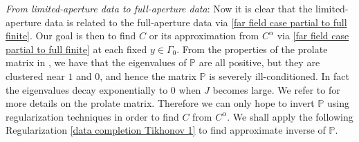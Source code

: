 \documentclass[final]{siamltex}
\begin{document}
\vspace{1\baselineskip}

\noindent\textit{From limited-aperture data to full-aperture data}:
Now it is clear that the limited-aperture data is related to the full-aperture data via  \eqref{far field case partial to full finite}. Our goal is then to find $C$ or its approximation from $C^\alpha $ via \eqref{far field case partial to full finite} at each fixed $y \in \Gamma_0$. From the properties of the prolate matrix in \cite[Lemma 3.2]{DLMZ2021}, we have that the eigenvalues of $\mathbb{P}$ are all positive, but they are clustered near $1$ and $0$, and hence the matrix $\mathbb{P}$  is severely ill-conditioned. In fact the eigenvalues decay exponentially to $0$ when $J$ becomes large. We refer to \cite{Slepian78,Varah1993} for more details on the prolate matrix. Therefore we can only hope to invert $\mathbb{P}$ using regularization techniques in order to find $C$ from $C^\alpha$. We shall apply
the following Regularization \eqref{data completion Tikhonov 1}
to find approximate inverse of $\mathbb{P}$.
\end{document}
